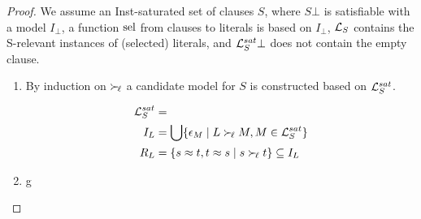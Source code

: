\begin{proof}
    We assume an Inst-saturated set of clauses $S$,
    where $S\bot$ is satisfiable with a model $I_\bot$,
    a function $\operatorname{sel}$ from clauses to literals is based on $I_\bot$,
    $\mathcal{L}_S$ contains the S-relevant instances of (selected) literals,
    and $\mathcal{L}_S^{sat}\bot$ does not contain the empty clause.

    \begin{enumerate}
        \item By induction on $\mathrel\succ_{\!\ell}$
        a candidate model for $S$ is constructed
        based on $\mathcal{L}_S^{sat}$.

        \begin{align*}
            \mathcal{L}_S^{sat} &=
            \\
            I_L &= \bigcup \{
                \epsilon_M \mid
                L \mathrel\succ_{\!\ell} M, M\in \mathcal{L}_S^{sat}
            \}
            \\
            R_L &= \{
                s\approx t, t\approx s \mid s\mathrel\succ_{\!\ell} t
            \} \subseteq I_L
        \end{align*}
        \item g
    \end{enumerate}
\end{proof}

